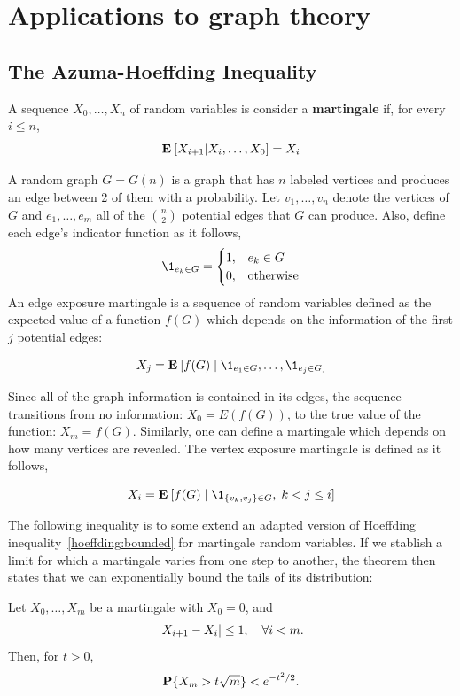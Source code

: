 \chapter{Applications to graph theory}

\section{The Azuma-Hoeffding Inequality}

\begin{definition}
    A sequence $X_0, \ldots, X_n$ of random variables is consider a \textbf{martingale} if, for every $i \leq n$,
    \[ \E [X_{i+1} | X_i,\ldots, X_0] = X_i \] 
\end{definition}

A random graph $G = G(n)$ is a graph that has $n$ labeled vertices and produces an edge between 2 of them with a probability. Let $v_1, \ldots, v_n$ denote the vertices of $G$ and $e_1, \ldots, e_m$ all of the $\binom{n}{2}$ potential edges that $G$ can produce. Also, define each edge's indicator function as it follows,
\[\1_{e_k \in G} = \begin{cases}
    1, & e_k \in G\\
    0, & \mbox{otherwise} 
\end{cases} \] 
An edge exposure martingale is a sequence of random variables defined as the expected value of a function $f(G)$ which depends on the information of the first $j$ potential edges:

\[ X_j = \E [f(G) \;|\; \1_{e_1 \in G}, \ldots, \1_{e_j \in G}] \] 

Since all of the graph information is contained in its edges, the sequence transitions from no information: $X_0 = E(f(G))$, to the true value of the function: $X_m = f(G)$. Similarly, one can define a martingale which depends on how many vertices are revealed. The vertex exposure martingale is defined as it follows,

\[ X_i = \E [f(G) \;|\; \1_{\{v_k, v_j\}\in G}, \; k < j \leq i] \] 

The following inequality is to some extend an adapted version of Hoeffding inequality~\ref{hoeffding:bounded} for martingale random variables. If we stablish a limit for which a martingale varies from one step to another, the theorem then states that we can exponentially bound the tails of its distribution:

\begin{theorem}\label{azuma}
    Let $X_0, \ldots, X_m$ be a martingale with $X_0 = 0$, and
    \[ |X_{i+1} - X_i| \leq 1, \hspace*{1em} \forall i < m. \]
    Then, for $t > 0$,
    \[ \P\{X_m > t\sqrt{m}\} < e^{-t^2 / 2}. \] 
\end{theorem}

